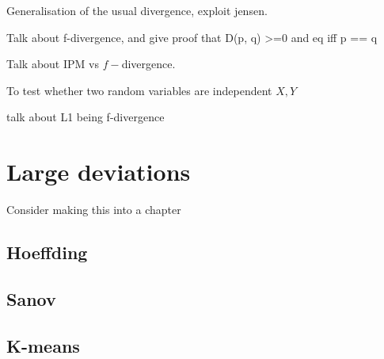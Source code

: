 Generalisation of the usual divergence, exploit jensen.

Talk about f-divergence, and give proof that D(p, q) >=0 and eq iff p == q

Talk about IPM vs $f-$divergence. 

To test whether two random variables are independent $X, Y$

talk about L1 being f-divergence


\section{Large deviations}

Consider making this into a chapter

\subsection{Hoeffding}

\subsection{Sanov}

\subsection{K-means}





